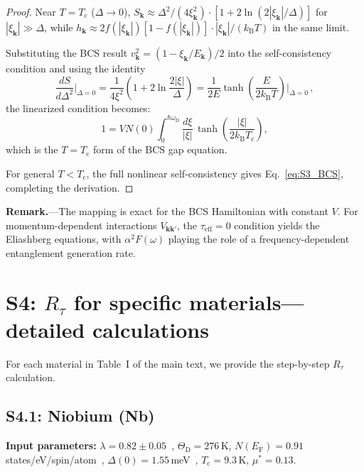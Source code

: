 \documentclass[prb,twocolumn,superscriptaddress,longbibliography,floatfix]{revtex4-2}
\newcommand{\kB}{k_{\mathrm{B}}}
\newcommand{\tauasym}{\tau}
\newcommand{\taueff}{\tauasym_{\mathrm{eff}}}
\newcommand{\Rtau}{R_{\tauasym}}
\newcommand{\Tc}{T_{\mathrm{c}}}
\newcommand{\oD}{\omega_{\mathrm{D}}}
\newcommand{\EF}{E_{\mathrm{F}}}
\newcommand{\Ek}{E_{\bm{k}}}
\newcommand{\xik}{\xi_{\bm{k}}}
\newcommand{\ThetaD}{\Theta_{\mathrm{D}}}
\begin{document}
\begin{proof}
Near $T = \Tc$ ($\Delta \to 0$), $S_{\bm{k}} \approx
\Delta^2/(4\xik^2) \cdot [1 + 2\ln(2|\xik|/\Delta)]$
for $|\xik| \gg \Delta$, while $h_{\bm{k}} \approx
2f(|\xik|)[1-f(|\xik|)] \cdot |\xik|/(\kB T)$ in the same limit.

Substituting the BCS result $v_{\bm{k}}^2 = (1 - \xik/\Ek)/2$
into the self-consistency condition and using the identity
\begin{equation}
  \frac{dS}{d\Delta^2}\bigg|_{\Delta=0}
  = \frac{1}{4\xi^2}\left(1 + 2\ln\frac{2|\xi|}{\Delta}\right)
  = \frac{1}{2E}\tanh\!\left(\frac{E}{2\kB T}\right)\bigg|_{\Delta=0}\,,
\end{equation}
the linearized condition becomes:
\begin{equation}
  1 = V N(0) \int_0^{\hbar\oD} \frac{d\xi}{|\xi|}\,
  \tanh\!\left(\frac{|\xi|}{2\kB\Tc}\right),
\end{equation}
which is the $T = \Tc$ form of the BCS gap equation.

For general $T < \Tc$, the full nonlinear self-consistency gives
Eq.~\eqref{eq:S3_BCS}, completing the derivation.
\end{proof}

\textbf{Remark.}---The mapping is exact for the BCS Hamiltonian
with constant $V$.  For momentum-dependent interactions
$V_{\bm{kk}'}$, the $\taueff = 0$ condition yields the
Eliashberg equations, with $\alpha^2 F(\omega)$ playing the role
of a frequency-dependent entanglement generation rate.

\section{S4: $\Rtau$ for specific materials---detailed calculations}
\label{sec:S4}

For each material in Table~I of the main text, we provide the
step-by-step $\Rtau$ calculation.

\subsection{S4.1: Niobium (Nb)}

\textbf{Input parameters:}
$\lambda = 0.82 \pm 0.05$~\cite{Allen1975_S},
$\ThetaD = 276\,$K,
$N(\EF) = 0.91\,$states/eV/spin/atom~\cite{Papaconstantopoulos1977},
$\Delta(0) = 1.55\,$meV~\cite{Tinkham2004_S},
$\Tc = 9.3\,$K, $\mu^* = 0.13$.
\end{document}
